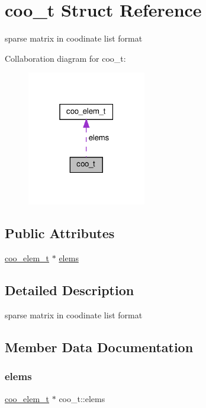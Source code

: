 \hypertarget{structcoo__t}{}\section{coo\+\_\+t Struct Reference}
\label{structcoo__t}


sparse matrix in coodinate list format  




Collaboration diagram for coo\+\_\+t\+:\nopagebreak
\begin{figure}[H]
\begin{center}
\leavevmode
\includegraphics[width=147pt]{structcoo__t__coll__graph}
\end{center}
\end{figure}
\subsection*{Public Attributes}
\begin{DoxyCompactItemize}
\item 
\hyperlink{structcoo__elem__t}{coo\+\_\+elem\+\_\+t} $\ast$ \hyperlink{structcoo__t_a2361913917213bd6d4c3274dca048c2a}{elems}
\end{DoxyCompactItemize}


\subsection{Detailed Description}
sparse matrix in coodinate list format 

\subsection{Member Data Documentation}
\mbox{\label{structcoo__t_a2361913917213bd6d4c3274dca048c2a}} 
\subsubsection{\texorpdfstring{elems}{elems}}
{\footnotesize\ttfamily \hyperlink{structcoo__elem__t}{coo\+\_\+elem\+\_\+t} $\ast$ coo\+\_\+t\+::elems}

